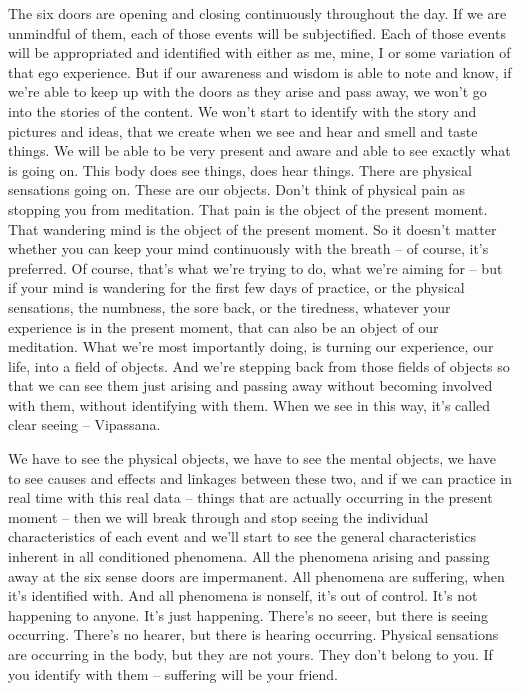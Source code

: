 \documentclass[letterpaper,10pt,english]{sphinxmanual}
\begin{document}
\sphinxAtStartPar
The  six  doors  are  opening  and  closing  continuously  throughout  the
day. If we are unmindful of them, each of those events will be subjectified.
Each of those events will be appropriated and identified with either as me,
mine, I or some variation of that ego experience. But if our awareness and
wisdom is able to note and know, if we’re able to keep up with the doors
as they arise and pass away, we won’t go into the stories of the content. We
won’t start to identify with the story and pictures and ideas, that we create
when we see and hear and smell and taste things. We will be able to be very
present and aware and able to see exactly what is going on. This body does
see things, does hear things. There are physical sensations going on. These
are our objects. Don’t think of physical pain as stopping you from meditation.   That pain is the object of the present moment. That wandering mind is
the object of the present moment. So it doesn’t matter whether you can keep
your mind continuously with the breath – of course, it’s preferred. Of course,
that’s what we’re trying to do, what we’re aiming for – but if your mind is
wandering for the first few days of practice, or the physical sensations, the
numbness, the sore back, or the tiredness, whatever your experience is in the
present moment, that can also be an object of our meditation. What we’re
most  importantly  doing,  is  turning  our  experience,  our  life,  into  a  field  of
objects. And  we’re  stepping  back  from  those  fields  of  objects  so  that  we
can see them just arising and passing away without becoming involved with
them, without identifying with them. When we see in this way, it’s called
clear seeing – Vipassana.

\sphinxAtStartPar
We have to see the physical objects, we have to see the mental objects,
we have to see causes and effects and linkages between these two, and if we
can practice in real time with this real data – things that are actually occurring  in  the  present  moment  –  then  we  will  break  through  and  stop  seeing
the individual characteristics of each event and we’ll start to see the general
characteristics  inherent  in  all  conditioned  phenomena. All  the  phenomena
arising and passing away at the six sense doors are impermanent. All phenomena are suffering, when it’s identified with. And all phenomena is nonself,  it’s  out  of  control.  It’s  not  happening  to  anyone.  It’s  just  happening.
There’s no see\sphinxhyphen{}er, but there is seeing occurring. There’s no hear\sphinxhyphen{}er, but there
is hearing occurring. Physical sensations are occurring in the body, but they
are not yours. They don’t belong to you. If you identify with them – suffering
will be your friend.
\end{document}
